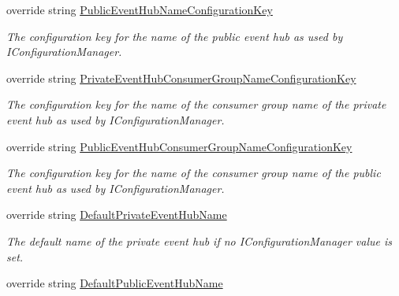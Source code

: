 \begin{DoxyCompactItemize}
override string \hyperlink{classCqrs_1_1Azure_1_1ServiceBus_1_1AzureEventHubBus_afd3a436ec413b208d201dab7750f8f9e_afd3a436ec413b208d201dab7750f8f9e}{Public\+Event\+Hub\+Name\+Configuration\+Key}
\begin{DoxyCompactList}\small\item\em The configuration key for the name of the public event hub as used by I\+Configuration\+Manager. \end{DoxyCompactList}\item 
override string \hyperlink{classCqrs_1_1Azure_1_1ServiceBus_1_1AzureEventHubBus_a2ef9980a763a789179a009d6e0972175_a2ef9980a763a789179a009d6e0972175}{Private\+Event\+Hub\+Consumer\+Group\+Name\+Configuration\+Key}
\begin{DoxyCompactList}\small\item\em The configuration key for the name of the consumer group name of the private event hub as used by I\+Configuration\+Manager. \end{DoxyCompactList}\item 
override string \hyperlink{classCqrs_1_1Azure_1_1ServiceBus_1_1AzureEventHubBus_a5e03e9ddac66cf136bde75e40fc11afc_a5e03e9ddac66cf136bde75e40fc11afc}{Public\+Event\+Hub\+Consumer\+Group\+Name\+Configuration\+Key}
\begin{DoxyCompactList}\small\item\em The configuration key for the name of the consumer group name of the public event hub as used by I\+Configuration\+Manager. \end{DoxyCompactList}\item 
override string \hyperlink{classCqrs_1_1Azure_1_1ServiceBus_1_1AzureEventHubBus_a8903cb16fa7bfc2396f249c48fe42a60_a8903cb16fa7bfc2396f249c48fe42a60}{Default\+Private\+Event\+Hub\+Name}
\begin{DoxyCompactList}\small\item\em The default name of the private event hub if no I\+Configuration\+Manager value is set. \end{DoxyCompactList}\item 
override string \hyperlink{classCqrs_1_1Azure_1_1ServiceBus_1_1AzureEventHubBus_a0d3aa3a2e36b52d131039955700955cb_a0d3aa3a2e36b52d131039955700955cb}{Default\+Public\+Event\+Hub\+Name}

\end{DoxyCompactItemize}
